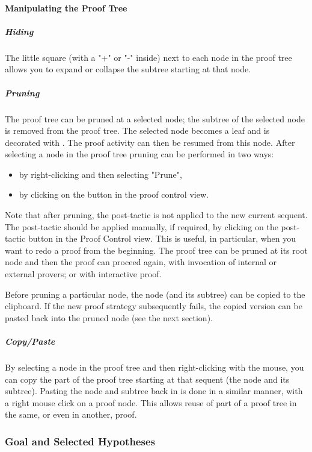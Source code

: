 \paragraph{Manipulating the Proof Tree}

\subparagraph{Hiding}

The little square (with a "+" or "-" inside) next to each node in the proof tree allows you to expand or collapse the subtree starting at that node. 

\subparagraph{Pruning}

The proof tree can be pruned at a selected node; the subtree of the selected node is removed from the proof tree. The selected node becomes a leaf and is decorated with . The proof activity can then be resumed from this node. After selecting a node in the proof tree pruning can be performed in two ways:

\begin{itemize}
	\item by right-clicking and then selecting "Prune",
	\item by clicking on the  button in the proof control view. 
\end{itemize}

Note that after pruning, the post-tactic is not applied to the new current sequent. The post-tactic should be applied manually, if required, by clicking on the post-tactic button in the Proof Control view. This is useful, in particular, when you want to redo a proof from the beginning. The proof tree can be pruned at its root node and then the proof can proceed again, with invocation of internal or external provers; or with interactive proof.

Before pruning a particular node, the node (and its subtree) can be copied to the clipboard. If the new proof strategy subsequently fails, the copied version can be pasted back into the pruned node (see the next section). 

\subparagraph{Copy/Paste}

By selecting a node in the proof tree and then right-clicking with the mouse, you can copy the part of the proof tree starting at that sequent (the node and its subtree). Pasting the node and subtree back in is done in a similar manner, with a right mouse click on a proof node. This allows reuse of part of a proof tree in the same, or even in another, proof.

\subsubsection{Goal and Selected Hypotheses}

